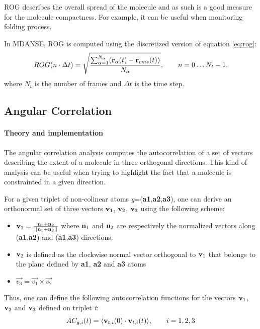 \documentclass[a4paper,11pt]{article}
\begin{document}
\gls{ROG} describes the overall spread of the molecule and as such is a good measure for the molecule compactness. For
example, it can be useful when monitoring folding process.

In \gls{MDANSE}, \gls{ROG} is computed using the discretized version of equation \ref{eq:rog}:
\begin{equation}
\label{eq:rog_num}
ROG(n\cdot\Delta t) = \sqrt{\frac{\sum_{\alpha = 1}^{N_{\alpha}}({\bf r}_{\alpha}(t) - {\bf r}_{cms}(t))}{N_{\alpha}}},
\qquad n = 0\ldots N_t - 1.
\end{equation}
where $N_t$ is the number of frames and $\Delta t$ is the time step.

\subsection{Angular Correlation}
\label{ac}
\paragraph{Theory and implementation\\}
\label{ac_theory}
The angular correlation analysis computes the autocorrelation of a set of vectors describing the extent of a molecule in three 
orthogonal directions. This kind of analysis can be useful when trying to highlight the fact that a molecule is constrainted 
in a given direction.

For a given triplet of non-colinear atoms \textit{g}=(\textbf{a1},\textbf{a2},\textbf{a3}), one can derive an orthonormal 
set of three vectors ${\bf v}_1$, ${\bf v}_2$, ${\bf v}_3$ using the following scheme:

\begin{itemize}
\item ${\bf v}_1 = \frac{{\bf n}_{1} + {\bf n}_{2}}{||{\bf n}_{1} + {\bf n}_{2}||}$
where ${\bf n}_{1}$ and ${\bf n}_{2}$ are respectively the normalized vectors along (\textbf{a1},\textbf{a2}) 
and (\textbf{a1},\textbf{a3}) directions.
\item ${\bf v}_2$ is defined as the clockwise normal vector orthogonal to ${\bf v}_1$ that belongs to the plane 
defined by \textbf{a1}, \textbf{a2} and \textbf{a3} atoms
\item $\vec{v_3} = \vec{v_1} \times \vec{v_2}$
\end{itemize}

Thus, one can define the following autocorrelation functions for the vectors ${\bf v}_1$, ${\bf v}_2$ and ${\bf v}_3$ 
defined on triplet \textit{t}:
\begin{equation}
\label{eq:ac_per_triplet}
AC_{g,i} (t) = \langle {\bf v}_{t,i}(0)\cdot{\bf v}_{t,i}(t)\rangle, \qquad  i = 1,2,3
\end{equation}
\end{document}
